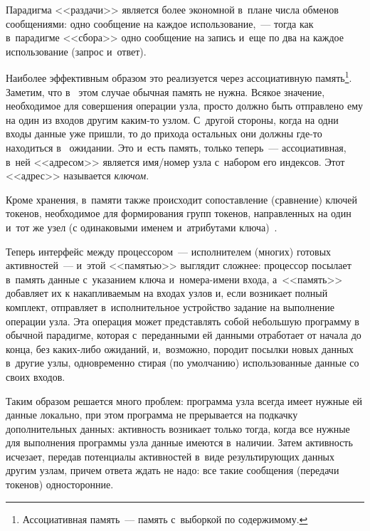 \begin{multicols}{2}
  
  Парадигма <<раздачи>> является более экономной в~плане числа обменов 
сообщениями: одно сообщение на каждое использование,~--- тогда как в~парадигме 
<<сбора>> одно сообщение на запись и~еще по два на каждое использование 
(запрос и~ответ).
  
  Наиболее эффективным образом это реализуется через ассоциативную 
память\footnote{Ассоциативная память~--- память с~выборкой по содержимому.}. Заметим, что в~
этом случае обычная память не нужна. Всякое значение, необходимое для 
совершения операции узла, просто должно быть отправлено ему на один из 
входов другим ка\-ким-то узлом. С~другой стороны, когда на одни входы 
данные уже пришли, то до прихода остальных они должны где-то находиться в~
ожидании. Это и~есть память, только теперь~--- ассоциативная, в~ней 
<<адресом>> является имя/но\-мер узла с~набором его индексов. Этот 
<<адрес>> называется \textit{ключом}.
  
  Кроме хранения, в~памяти также происходит сопоставление (сравнение) 
ключей токенов, необходимое для формирования групп токенов, на\-прав\-лен\-ных 
на один и~тот же узел (с одинаковыми именем и~атрибутами  
ключа)~\cite{4-zm}.

 
  Теперь интерфейс между процессором~--- исполнителем (многих) готовых 
активностей~--- и~этой <<памятью>> выглядит сложнее: процессор посылает 
в~память данные с~указанием ключа и~но\-ме\-ра-име\-ни входа, а~<<память>> 
добавляет их к накапливаемым на входах узлов и, если возникает полный 
комплект, отправляет в~исполнительное устройство задание на выполнение 
операции узла. Эта операция может представлять собой небольшую программу 
в обычной парадигме, которая с~переданными ей данными отработает от начала 
до конца, без ка\-ких-ли\-бо ожиданий, и,~возможно, породит посылки новых 
данных в~другие узлы, одновременно стирая (по умолчанию) использованные 
данные со своих входов.
  
  Таким образом решается много проблем: программа узла всегда имеет 
нужные ей данные локально, при этом программа не прерывается на подкачку 
дополнительных данных: активность возникает только тогда, когда все нужные 
для выполнения программы узла данные имеются в~наличии. Затем активность 
исчезает, передав потенциалы активностей в~виде результирующих данных 
другим узлам, причем ответа ждать не надо: все такие сообщения (передачи 
токенов) односторонние.


\end{multicols}
